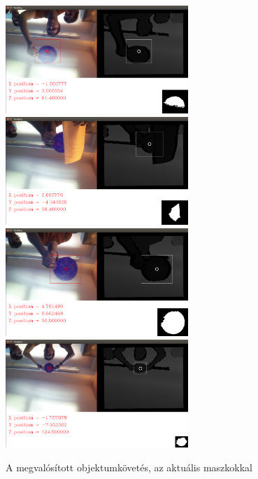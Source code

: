 \begin{figure}[!h]
	\centering
	\includegraphics[width=69mm, keepaspectratio]{figures/m08/fig1.jpg}\hspace{5mm}
	\includegraphics[width=69mm, keepaspectratio]{figures/m08/fig2.jpg}\\\vspace{5mm}
	\includegraphics[width=69mm, keepaspectratio]{figures/m08/fig3.jpg}\hspace{5mm}
	\includegraphics[width=69mm, keepaspectratio]{figures/m08/fig4.jpg}
	\caption{A megvalósított objektumkövetés, az aktuális maszkokkal} 
	\label{fig:Dejong}
\end{figure}

